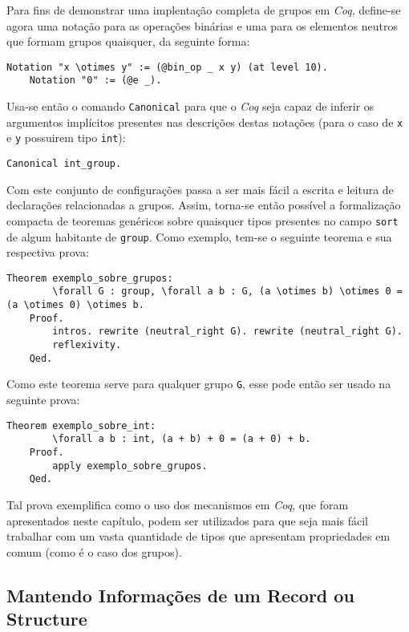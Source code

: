 Para fins de demonstrar uma implentação completa de grupos em \textit{Coq}, define-se agora uma notação para as operações binárias e uma para os elementos neutros que formam grupos quaisquer, da seguinte forma:
\begin{lstlisting}[language = coq]
    Notation "x \otimes y" := (@bin_op _ x y) (at level 10).
    Notation "0" := (@e _).
\end{lstlisting}
Usa-se então o comando \lstinline[language = coq]$Canonical$ para que o \textit{Coq} seja capaz de inferir os argumentos implícitos presentes nas descrições destas notações (para o caso de \lstinline[language = coq]$x$ e  \lstinline[language = coq]$y$ possuirem tipo  \lstinline[language = coq]$int$):
\begin{lstlisting}[language = coq]
    Canonical int_group.
\end{lstlisting}
Com este conjunto de configurações passa a ser mais fácil a escrita e leitura de declarações relacionadas a grupos. Assim, torna-se então possível a formalização compacta de teoremas genéricos sobre quaisquer tipos presentes no campo \lstinline[language = coq]$sort$ de algum habitante de \lstinline[language = coq]$group$. Como exemplo, tem-se o seguinte teorema e sua respectiva prova:
\begin{lstlisting}[language = coq]
    Theorem exemplo_sobre_grupos: 
        \forall G : group, \forall a b : G, (a \otimes b) \otimes 0 = (a \otimes 0) \otimes b.
    Proof.
        intros. rewrite (neutral_right G). rewrite (neutral_right G).
        reflexivity. 
    Qed.
\end{lstlisting}
Como este teorema serve para qualquer grupo \lstinline[language = coq]$G$, esse pode então ser usado na seguinte prova:
\begin{lstlisting}[language = coq]
    Theorem exemplo_sobre_int:
        \forall a b : int, (a + b) + 0 = (a + 0) + b.
    Proof.
        apply exemplo_sobre_grupos.
    Qed.
\end{lstlisting}
Tal prova exemplifica como o uso dos mecanismos em \textit{Coq}, que foram apresentados neste capítulo, podem ser utilizados para que seja mais fácil trabalhar com um vasta quantidade de tipos que apresentam propriedades em comum (como é o caso dos grupos).

\subsection{Mantendo Informações de um Record ou Structure}

